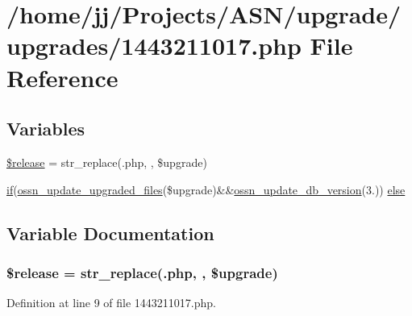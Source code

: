 \hypertarget{1443211017_8php}{}\section{/home/jj/\+Projects/\+A\+S\+N/upgrade/upgrades/1443211017.php File Reference}
\label{1443211017_8php}
\subsection*{Variables}
\begin{DoxyCompactItemize}
\item 
\hyperlink{1443211017_8php_a63c5d6a8a9f1768ea926cee666dc991b}{\$release} = str\+\_\+replace(\textquotesingle{}.php\textquotesingle{}, \textquotesingle{}\textquotesingle{}, \$upgrade)
\item 
\hyperlink{jquery_8tokeninput_8js_ad8dd46a3cbc004569e34401e9e71771a}{if}(\hyperlink{ossn_8lib_8upgrade_8php_af5e235e44fa65a589d768b2693399250}{ossn\+\_\+update\+\_\+upgraded\+\_\+files}(\$upgrade)\&\&\hyperlink{ossn_8lib_8upgrade_8php_aa7120e10a9c14b722b0e25c99bc86d92}{ossn\+\_\+update\+\_\+db\+\_\+version}(\textquotesingle{}3.\textquotesingle{})) \hyperlink{1443211017_8php_a061296d3dbcda98bcce6ad903dec38ee}{else}
\end{DoxyCompactItemize}


\subsection{Variable Documentation}
\subsubsection[{\texorpdfstring{\$release}{$release}}]{\setlength{\rightskip}{0pt plus 5cm}\$release = str\+\_\+replace(\textquotesingle{}.php\textquotesingle{}, \textquotesingle{}\textquotesingle{}, \$upgrade)}\hypertarget{1443211017_8php_a63c5d6a8a9f1768ea926cee666dc991b}{}\label{1443211017_8php_a63c5d6a8a9f1768ea926cee666dc991b}


Definition at line 9 of file 1443211017.\+php.

